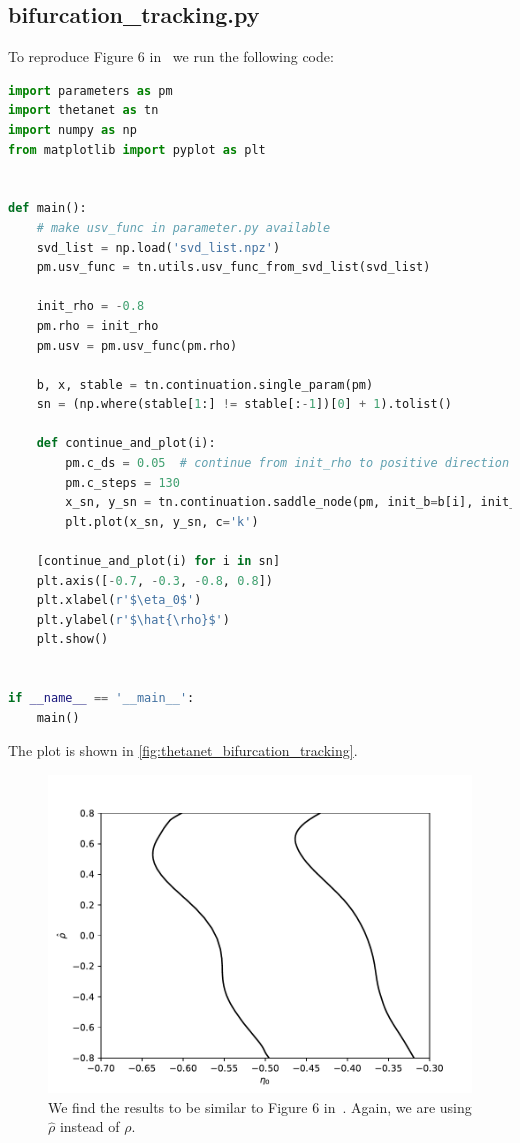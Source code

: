 \documentclass[bibliography=totoc, twoside]{article}
\numberwithin{equation}{section}
\begin{document}
\subsection*{bifurcation\_tracking.py}
To reproduce Figure 6 in~\cite{Laing2019} we run the following code:
\begin{lstlisting}[language=python]
import parameters as pm
import thetanet as tn
import numpy as np
from matplotlib import pyplot as plt


def main():
    # make usv_func in parameter.py available
    svd_list = np.load('svd_list.npz')
    pm.usv_func = tn.utils.usv_func_from_svd_list(svd_list)

    init_rho = -0.8
    pm.rho = init_rho
    pm.usv = pm.usv_func(pm.rho)

    b, x, stable = tn.continuation.single_param(pm)
    sn = (np.where(stable[1:] != stable[:-1])[0] + 1).tolist()

    def continue_and_plot(i):
        pm.c_ds = 0.05  # continue from init_rho to positive direction
        pm.c_steps = 130
        x_sn, y_sn = tn.continuation.saddle_node(pm, init_b=b[i], init_x=x[i], init_y=init_rho)[1:]
        plt.plot(x_sn, y_sn, c='k')

    [continue_and_plot(i) for i in sn]
    plt.axis([-0.7, -0.3, -0.8, 0.8])
    plt.xlabel(r'$\eta_0$')
    plt.ylabel(r'$\hat{\rho}$')
    plt.show()


if __name__ == '__main__':
    main()
\end{lstlisting}
The plot is shown in \autoref{fig:thetanet_bifurcation_tracking}.
\begin{figure}
    \centering
    \includegraphics[width=.8\linewidth]{bifurcation_tracking.pdf}
    \caption{We find the results to be similar to Figure 6 in~\cite{Laing2019}.
    Again, we are using $\hat{\rho}$ instead of $\rho$.}
    \label{fig:thetanet_bifurcation_tracking}
\end{figure}



\end{document}
